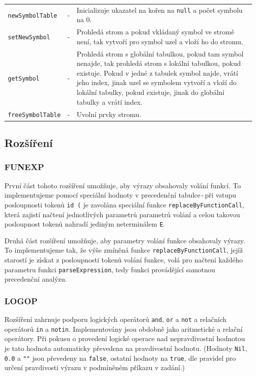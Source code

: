 \documentclass[12pt,a4paper,titlepage,final]{article}
\begin{document}
\begin{tabular}{llp{11.9cm}}
\texttt{newSymbolTable}  & - & Inicializuje ukazatel na kořen na \texttt{null} a počet symbolu na 0.\\
\texttt{setNewSymbol}    & - & Prohledá strom a pokud vkládaný symbol ve stromě není, 
                               tak vytvoří pro symbol uzel a vloží ho do stromu.\\                        
\texttt{getSymbol}       & - & Prohledá strom s globální tabulkou, pokud tam symbol nenajde,  
                               tak prohledá strom s lokální tabulkou, pokud existuje.  
                               Pokud v jedné z tabulek symbol najde, vrátí jeho index, 
                               jinak uzel se symbolem vytvoří a vloží do lokální tabulky, 
                               pokud existuje, jinak do globální tabulky a vrátí index.\\
\texttt{freeSymbolTable} & - & Uvolní prvky stromu.\\
\end{tabular}
\subsection{Rozšíření}
\subsubsection{FUNEXP}
První část tohoto rozšíření umožňuje, aby výrazy obsahovaly volání funkcí. To
implementujeme pomocí speciální hodnoty v precedenční tabulce\,-\,při vstupu
posloupnosti tokenů \texttt{id (} je zavolána speciální funkce
\texttt{replaceByFunctionCall}, která zajistí načtení jednotlivých parametrů
parametrů volání a celou takovou posloupnost tokenů nahradí jediným
neterminálem \texttt{E}.

Druhá část rozšíření umožňuje, aby parametry volání funkce obsahovaly výrazy.
To implementujeme tak, že výše zmíněná funkce \texttt{replaceByFunctionCall},
jejíž starostí je získat z posloupnosti tokenů volání funkce, volá pro načtení
každého parametru funkci \texttt{parseExpression}, tedy funkci provádějící
samotnou precedenční analýzu.

\subsubsection{LOGOP}
Rozšíření zahrnuje podporu logických operátorů \texttt{and}, \texttt{or} a
\texttt{not} a relačních operátorů \texttt{in} a \texttt{notin}.
Implementovány jsou obdobně jako aritmetické a relační operátory. Při pokusu
o provedení logické operace nad nepravdivostní hodnotou je tato hodnota
automaticky převedena na pravdivostní hodnotu. (Hodnoty \texttt{Nil}, \texttt{0.0} a
\texttt{""} jsou převedeny na \texttt{false}, ostatní hodnoty na \texttt{true},
dle pravidel pro určení pravdivosti výrazu v podmíněném příkazu v zadání.)
\end{document}
